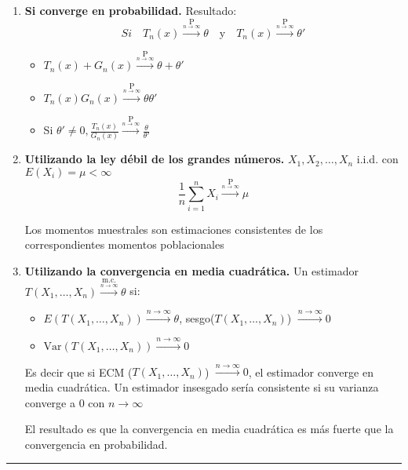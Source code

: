 \documentclass{article}
\begin{document}
\begin{enumerate}
    \setlength{\parskip}{1em}
    \item \textbf{Si converge en probabilidad.}
          Resultado:
          \[
              Si \quad T_n(x) \xrightarrow{\underset{n \to \infty}{\text{P}}} \theta \quad \text{y} \quad T_n(x) \xrightarrow{\underset{n \to \infty}{\text{P}}} \theta'
          \]
          \begin{itemize}
              \item \(T_n(x)+G_n(x) \xrightarrow{\underset{n \to \infty}{\text{P}}} \theta + \theta '\)
              \item \(T_n(x)G_n(x) \xrightarrow{\underset{n \to \infty}{\text{P}}} \theta\theta '\)
              \item Si \(\theta' \neq 0, \frac{T_n(x)}{G_n(x)} \xrightarrow{\underset{n \to \infty}{\text{P}}} \frac{\theta}{\theta '}\)
          \end{itemize}

    \item \textbf{Utilizando la ley débil de los grandes números.}
          \(X_1, X_2, \dots, X_n\) i.i.d. con \(E(X_i)=\mu < \infty\)
          \setlength{\parskip}{0em}
          \[\frac{1}{n}\sum_{i=1}^{n} X_i \xrightarrow{\underset{n \to \infty}{\text{P}}} \mu\]

          \setlength{\parskip}{1em}
          Los momentos muestrales son estimaciones consistentes de los correspondientes momentos poblacionales

    \item \textbf{Utilizando la convergencia en media cuadrática.}
          Un estimador $T(X_1, \dots, X_n)\xrightarrow{\underset{n \to \infty}{\text{m.c.}}} \theta$ si:
          \begin{itemize}
              \item \(E(T(X_1, \dots, X_n)) \xrightarrow{{n \to \infty}} \theta\), sesgo(\(T(X_1, \dots, X_n)\)) \(\xrightarrow{{n \to \infty}} 0\)
              \item \(\text{Var}(T(X_1, \dots, X_n)) \xrightarrow{{n \to \infty}} 0\)
          \end{itemize}
          Es decir que si ECM ($T(X_1, \dots, X_n)$) \(\xrightarrow{{n \to \infty}} 0\), el estimador converge en media cuadrática. Un estimador insesgado sería consistente si su varianza converge a 0 con \(n \to \infty\)

          El resultado es que la convergencia en media cuadrática es más fuerte que la convergencia en probabilidad.
\end{enumerate}
\noindent\rule{\textwidth}{0.2pt} %
\end{document}
